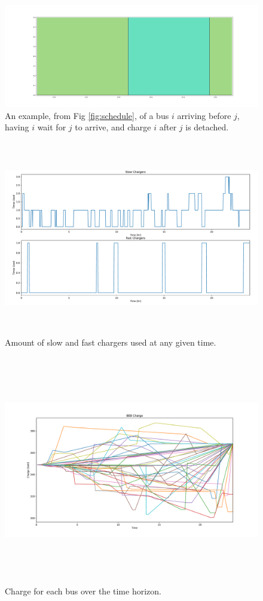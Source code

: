 \documentclass[letterpaper, 10pt, conference]{IEEEtran}
\begin{document}
\begin{figure}[ht]
	\centering
	\includegraphics[trim=0in 1in 0in 1in, width=\linewidth]{unoptimal.pdf}
	\caption{An example, from Fig \ref{fig:schedule}, of a bus $i$ arriving before $j$, having $i$ wait for $j$ to arrive, and charge $i$ after $j$ is detached.}
	\label{fig:unoptimal}
\end{figure}

\begin{figure}[!ht]
	\centering
	\includegraphics[trim=0in 0.5in 0in 1in, width=\linewidth, height=8.5cm]{usage.pdf}
	\caption{Amount of slow and fast chargers used at any given time.}
	\label{fig:usage}
\end{figure}

\begin{figure}
	\centering
	\includegraphics[trim= 0in 0in 0in 0.25in, width=\linewidth, height=10cm]{charges.pdf}
	\caption{Charge for each bus over the time horizon.}
	\label{fig:charges}
\end{figure}
\end{document}
